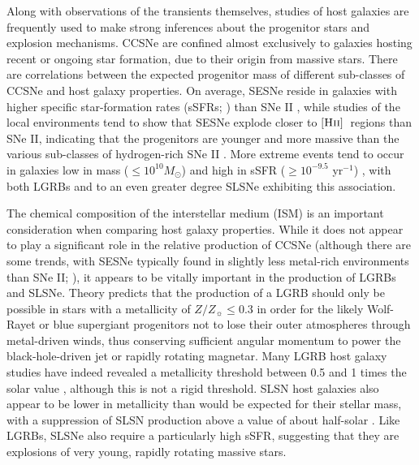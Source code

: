 \documentclass[fleqn,usenatbib,]{mnras}
\newcommand{\replyref}[1]{\color{magenta}#1 \color{black}}
\newcommand{\HII}[0]{$[\textnormal{\textsc{Hii}}]$}
\begin{document}
 Along with observations of the transients themselves, studies of host galaxies are frequently used to make strong inferences about the progenitor stars and explosion mechanisms. CCSNe are confined almost exclusively to galaxies hosting recent or ongoing star formation, due to their origin from massive stars. There are correlations between the expected progenitor mass of different sub-classes of CCSNe and host galaxy properties. On average, SESNe reside in galaxies with higher specific star-formation rates (sSFRs; \citealt{James2006,Kelly2008}) \replyref{than SNe II}, while studies of the local environments tend to show that SESNe explode closer to \HII~regions than SNe II, indicating that the progenitors are younger and more massive than the various sub-classes of hydrogen-rich SNe II  \citep[e.g.][]{Anderson2012,Galbany2018}. More extreme events tend to occur in galaxies low in mass \replyref{($\leq10^{10} M_{\odot}$) and high in sSFR ($\geq 10^{-9.5}$ yr$^{-1}$)}, with both LGRBs \citep[e.g.][]{Fruchter2006,LeFloch2006,Levesque2010,Kruehler2015,Vergani2015,Perley2016b,Palmerio2019,Taggart2019} and to an even greater degree SLSNe \citep[e.g.][]{Neill2011,Lunnan2014,Leloudas2015,Angus2016,Schulze2018,Taggart2019} exhibiting this association.
 
 The chemical composition of the interstellar medium (ISM) is an important consideration when comparing host galaxy properties. While it does not appear to play a significant role in the relative production of CCSNe (although there are some trends, with SESNe typically found in slightly less metal-rich environments than SNe II; \citealt{Galbany2018}), it appears to be vitally important in the production of LGRBs and SLSNe. Theory predicts that the production of a LGRB should only be possible in stars with a metallicity of $Z/Z_{\sun}\leq 0.3$ \citep{Woosley1993}  in order for the likely Wolf-Rayet or blue supergiant progenitors not to lose their outer atmospheres through metal-driven winds, thus conserving sufficient angular momentum to power the black-hole-driven jet or rapidly rotating magnetar. Many LGRB host galaxy studies have indeed revealed a metallicity threshold between 0.5 and 1 times the solar value \citep[e.g.][]{Stanek2006,Modjaz2008,Kruehler2015,Perley2016b,Japelj2016,Vergani2017}, although this is not a rigid threshold.  
SLSN host galaxies also appear to be lower in metallicity than would be expected for their stellar mass, with a suppression of SLSN production above a value of about half-solar \citep{Lunnan2014,Chen2016a,Perley2016c}. Like LGRBs, SLSNe also require a particularly high sSFR, suggesting that they are explosions of very young, rapidly rotating massive stars.
 
\end{document}
